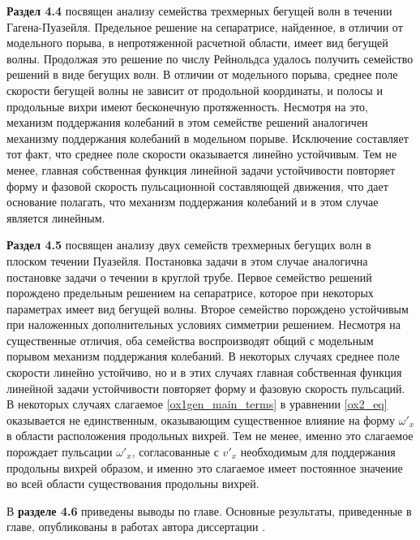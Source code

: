 \textbf{Раздел 4.4} посвящен анализу семейства трехмерных бегущей волн в течении Гагена-Пуазейля. Предельное решение на сепаратрисе, найденное, в отличии от модельного порыва, в непротяженной расчетной области, имеет вид бегущей волны. Продолжая это решение по числу Рейнольдса удалось получить семейство решений в виде бегущих волн. В отличии от модельного порыва, среднее поле скорости бегущей волны не зависит от продольной координаты, и полосы и продольные вихри имеют бесконечную протяженность. Несмотря на это, механизм поддержания колебаний в этом семействе решений аналогичен механизму поддержания колебаний в модельном порыве. Исключение составляет тот факт, что среднее поле скорости оказывается линейно устойчивым. Тем не менее, главная собственная функция линейной задачи устойчивости повторяет форму и фазовой скорость пульсационной составляющей движения, что дает основание полагать, что механизм поддержания колебаний и в этом случае является линейным. 

\textbf{Раздел 4.5} посвящен анализу двух семейств трехмерных бегущих волн в плоском течении Пуазейля. Постановка задачи в этом случае аналогична постановке задачи о течении в круглой трубе. Первое семейство решений порождено предельным решением на сепаратрисе, которое при некоторых параметрах имеет вид бегущей волны. Второе семейство порождено устойчивым при наложенных дополнительных условиях симметрии решением. Несмотря на существенные отличия, оба семейства воспроизводят общий с модельным порывом механизм поддержания колебаний. В некоторых случаях среднее поле скорости линейно устойчиво, но и в этих случаях главная собственная функция линейной задачи устойчивости повторяет форму и фазовую скорость пульсаций. В некоторых случаях слагаемое \eqref{ox1gen_main_terms} в уравнении \eqref{ox2_eq} оказывается не единственным, оказывающим существенное влияние на форму $\omega'_x$ в области расположения продольных вихрей. Тем не менее, именно это слагаемое порождает пульсации $\omega'_x$, согласованные с $v'_x$ необходимым для поддержания продольны вихрей образом, и именно это слагаемое имеет постоянное значение во всей области существования продольны вихрей. 

В \textbf{разделе 4.6} приведены выводы по главе. Основные результаты, приведенные в главе, опубликованы в работах автора диссертации \cite{Vest18, KMU2016}. 

